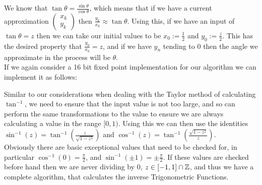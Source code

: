 {We know that \(\tan\theta = \frac{\sin\theta}{\cos\theta}\), which means that if we have a current approximation \(\left(\begin{array}{c}x_k\\y_k\end{array}\right)\) then \(\frac{y_k}{x_k} \approx \tan\theta\). Using this, if we have an input of \(\tan\theta = z\) then we can take our initial values to be \(x_0 := \tfrac{1}{2}\) and \(y_0 := \tfrac{z}{2}\). This has the desired property that \(\tfrac{y_0}{x_0} = z\), and if we have \(y_n\) tending to 0 then the angle we approximate in the process will be \(\theta\). \\

If we again consider a 16 bit fixed point implementation for our algorithm we can implement it as follows:


Similar to our considerations when dealing with the Taylor method of calculating \(\tan^{-1}\), we need to ensure that the input value is not too large, and so can perform the same transformations to the value to ensure we are always calculating a value in the range \([0,1)\). Using this we can then use the identities \(\sin^{-1}(z) = \tan^{-1}(\frac{z}{\sqrt{1-z^2}})\) and \(\cos^{-1}(z) = \tan^{-1}(\frac{\sqrt{1 - z^2}}{z})\). \\

Obviously there are basic exceptional values that need to be checked for, in particular \(\cos^{-1}(0) = \tfrac{\pi}{2}\), and \(\sin^{-1}(\pm1) = \pm\tfrac{\pi}{2}\). If these values are checked before hand then we are never dividing by 0, \(z \in [-1,1]\cap\mathbb{Z}\), and thus we have a complete algorithm, that calculates the inverse Trigonometric Functions.\\

}
